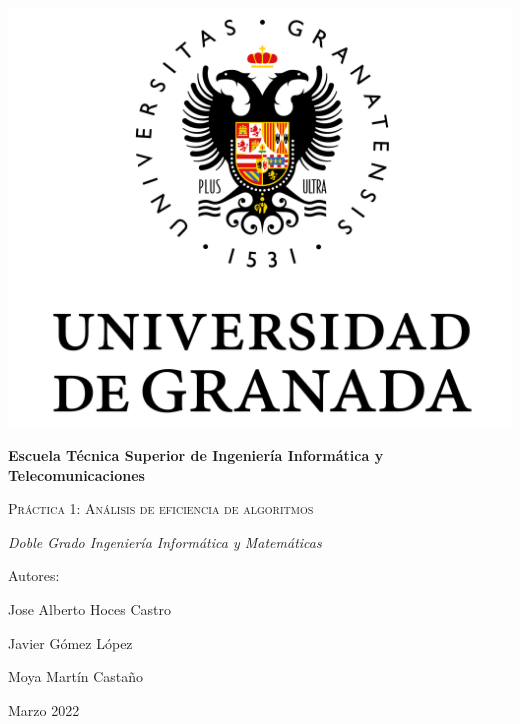 \documentclass[10pt,a4paper]{article}
\begin{document}
	
\begin{titlepage}
	\centering
	{\includegraphics[scale=0.5]{Logo_UGR.png}\par}
	\vspace{1cm}
	{\bfseries\Large Escuela T\'ecnica Superior de Ingeniería Informática y Telecomunicaciones \par}
	\vspace{2.5cm}
	{\scshape\Huge Pr\'actica 1: An\'alisis de eficiencia de algoritmos \par}
	\vspace{3cm}
	{\itshape\Large Doble Grado Ingeniería Informática y Matemáticas}
	\vfill
	{\Large Autores: \par}
	{\Large Jose Alberto Hoces Castro\par}
	{\Large Javier Gómez López \par}
	{\Large Moya Mart\'in Castaño \par}
	\vfill
	{\Large Marzo 2022 \par}
\end{titlepage}

\thispagestyle{empty}
\null
\vfill
\end{document}

